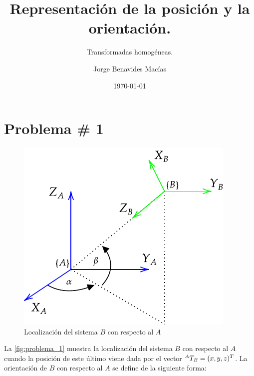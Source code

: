\documentclass[11pt,a4paper]{article}
\begin{document}
\subject{Fundamentos de robótica}
\title{Representación de la posición y la orientación.}
\subtitle{Transformadas homogéneas.}
\author{Jorge Benavides Macías}
\date{\today}

\portada

\section*{Problema \# 1}

\begin{figure}[H]
    \centering
    \includegraphics[scale=1]{images/robotica_tarea_2_problema_1.pdf}
    \caption{Localización del sistema ${B}$ con respecto al ${A}$}
    \label{fig:problema_1}
\end{figure}

La \autoref{fig:problema_1} muestra la localización del sistema ${B}$ con respecto al ${A}$ cuando la posición de este último viene dada por el vector ${}^AT_{{B}} = (x, y, z)^T$. La orientación de ${B}$ con respecto al ${A}$ se define de la siguiente forma:
\end{document}
